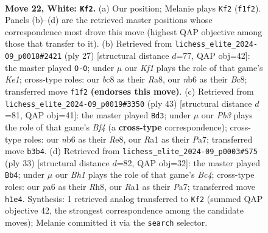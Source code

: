 \documentclass[11pt]{article}
\begin{document}
\clearpage

\begin{figure}[p]\centering
\begin{subfigure}{0.46\textwidth}\centering
\resizebox{\linewidth}{!}{%
\newchessgame
\chessboard[
  setfen={rnb3k1/1p2b3/pn1rppp1/7p/8/1P2P1P1/P1pNP2P/R1B1RK1B w - - 0 22},
  showmover=false,
  pgfstyle=straightmove, color=movearrow, markmove={f1-f2}
]}
\caption{}
\end{subfigure}\hfill
\begin{subfigure}{0.46\textwidth}\centering
\resizebox{\linewidth}{!}{%
\newchessgame
\chessboard[
  setfen={r1bbk2r/pp1n1ppp/2p5/3p4/3P2PP/1PP1N3/1P3P2/R1B1K1NR b KQkq - 0 14},
  showmover=false,
  pgfstyle=straightmove, color=movearrow, markmove={e8-g8}
]}
\caption{}
\end{subfigure}
\\[4pt]
\begin{subfigure}{0.46\textwidth}\centering
\resizebox{\linewidth}{!}{%
\newchessgame
\chessboard[
  setfen={3rr1k1/pp3pb1/2n4p/2p2bp1/2P5/N6P/PP1N1PP1/R1B2RK1 b - - 1 22},
  showmover=false,
  pgfstyle=straightmove, color=movearrow, markmove={f5-d3}
]}
\caption{}
\end{subfigure}\hfill
\begin{subfigure}{0.46\textwidth}\centering
\resizebox{\linewidth}{!}{%
\newchessgame
\chessboard[
  setfen={2r2k1r/pp1p1pp1/4pn2/2b4p/4PB2/2N2P2/PPPR1P1P/5RK1 b - - 0 17},
  showmover=false,
  pgfstyle=straightmove, color=movearrow, markmove={c5-b4}
]}
\caption{}
\end{subfigure}
\caption{\textbf{Move 22, White: \texttt{Kf2}.} (a) Our position; Melanie plays \texttt{Kf2} (\texttt{f1f2}). Panels (b)--(d) are the retrieved master positions whose correspondence most drove this move (highest QAP objective among those that transfer to it). (b) Retrieved from \texttt{lichess\_elite\_2024-09\_p0018\#2421} (ply 27) [structural distance $d$=77, QAP obj=42]: the master played \texttt{O-O}; under $\mu$ our \emph{Kf1} plays the role of that game's \emph{Ke1}; cross-type roles: our \emph{b}c8 as their \emph{R}a8, our \emph{n}b6 as their \emph{B}c8; transferred move \texttt{f1f2} \textbf{(endorses this move)}. (c) Retrieved from \texttt{lichess\_elite\_2024-09\_p0019\#3350} (ply 43) [structural distance $d$=81, QAP obj=41]: the master played \texttt{Bd3}; under $\mu$ our \emph{Pb3} plays the role of that game's \emph{Bf4} (a \textbf{cross-type} correspondence); cross-type roles: our \emph{n}b6 as their \emph{R}e8, our \emph{R}a1 as their \emph{P}a7; transferred move \texttt{b3b4}. (d) Retrieved from \texttt{lichess\_elite\_2024-09\_p0003\#575} (ply 33) [structural distance $d$=82, QAP obj=32]: the master played \texttt{Bb4}; under $\mu$ our \emph{Bh1} plays the role of that game's \emph{Bc4}; cross-type roles: our \emph{p}a6 as their \emph{R}h8, our \emph{R}a1 as their \emph{P}a7; transferred move \texttt{h1e4}. Synthesis: 1 retrieved analog transferred to \texttt{Kf2} (summed QAP objective 42, the strongest correspondence among the candidate moves); Melanie committed it via the \texttt{search} selector.}
\label{fig:thought-m42}
\end{figure}
\end{document}
